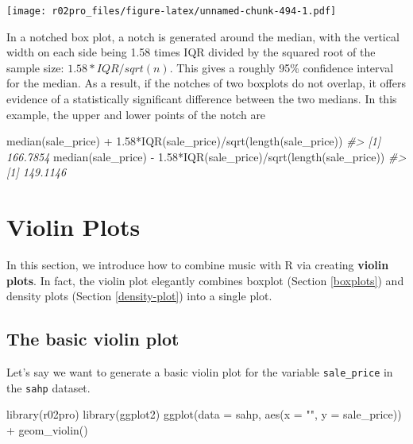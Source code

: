 \documentclass[
]{book}
\newenvironment{Shaded}{\begin{snugshade}}{\end{snugshade}}
\newcommand{\AttributeTok}[1]{\textcolor[rgb]{0.77,0.63,0.00}{#1}}
\newcommand{\CommentTok}[1]{\textcolor[rgb]{0.56,0.35,0.01}{\textit{#1}}}
\newcommand{\FloatTok}[1]{\textcolor[rgb]{0.00,0.00,0.81}{#1}}
\newcommand{\FunctionTok}[1]{\textcolor[rgb]{0.00,0.00,0.00}{#1}}
\newcommand{\NormalTok}[1]{#1}
\newcommand{\SpecialCharTok}[1]{\textcolor[rgb]{0.00,0.00,0.00}{#1}}
\newcommand{\StringTok}[1]{\textcolor[rgb]{0.31,0.60,0.02}{#1}}
\begin{document}
\texttt{[image: r02pro\_files/figure-latex/unnamed-chunk-494-1.pdf]}

In a notched box plot, a notch is generated around the median, with the vertical width on each side being 1.58 times IQR divided by the squared root of the sample size: \(1.58 * IQR / sqrt(n)\). This gives a roughly 95\% confidence interval for the median. As a result, if the notches of two boxplots do not overlap, it offers evidence of a statistically significant difference between the two medians. In this example, the upper and lower points of the notch are

\begin{Shaded}
\begin{Highlighting}[]
\FunctionTok{median}\NormalTok{(sale\_price) }\SpecialCharTok{+} \FloatTok{1.58}\SpecialCharTok{*}\FunctionTok{IQR}\NormalTok{(sale\_price)}\SpecialCharTok{/}\FunctionTok{sqrt}\NormalTok{(}\FunctionTok{length}\NormalTok{(sale\_price))}
\CommentTok{\#\textgreater{} [1] 166.7854}
\FunctionTok{median}\NormalTok{(sale\_price) }\SpecialCharTok{{-}} \FloatTok{1.58}\SpecialCharTok{*}\FunctionTok{IQR}\NormalTok{(sale\_price)}\SpecialCharTok{/}\FunctionTok{sqrt}\NormalTok{(}\FunctionTok{length}\NormalTok{(sale\_price))}
\CommentTok{\#\textgreater{} [1] 149.1146}
\end{Highlighting}
\end{Shaded}

\hypertarget{violin}{%
\section{Violin Plots}\label{violin}}

In this section, we introduce how to combine music with R via creating \textbf{violin plots}. In fact, the violin plot elegantly combines boxplot (Section \ref{boxplots}) and density plots (Section \ref{density-plot}) into a single plot.

\hypertarget{the-basic-violin-plot}{%
\subsection{The basic violin plot}\label{the-basic-violin-plot}}

Let's say we want to generate a basic violin plot for the variable \texttt{sale\_price} in the \texttt{sahp} dataset.

\begin{Shaded}
\begin{Highlighting}[]
\FunctionTok{library}\NormalTok{(r02pro)}
\FunctionTok{library}\NormalTok{(ggplot2)}
\FunctionTok{ggplot}\NormalTok{(}\AttributeTok{data =}\NormalTok{ sahp, }\FunctionTok{aes}\NormalTok{(}\AttributeTok{x =} \StringTok{""}\NormalTok{, }\AttributeTok{y =}\NormalTok{ sale\_price)) }\SpecialCharTok{+} \FunctionTok{geom\_violin}\NormalTok{()}
\end{Highlighting}
\end{Shaded}
\end{document}
